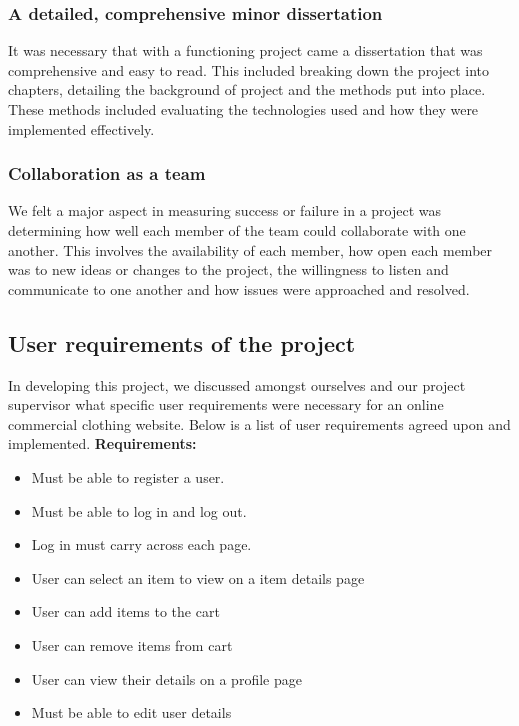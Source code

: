 \subsubsection{A detailed, comprehensive minor dissertation} It was necessary that with a functioning project came a dissertation that was comprehensive and easy to read. This included breaking down the project into chapters, detailing the background of project and the methods put into place. These methods included evaluating the technologies used and how they were implemented effectively.

\subsubsection{Collaboration as a team}
We felt a major aspect in measuring success or failure in a project was determining how well each member of the team could collaborate with one another. This involves the availability of each member, how open each member was to new ideas or changes to the project, the willingness to listen and communicate to one another and how issues were approached and resolved.

\subsection{User requirements of the project}
In developing this project, we discussed amongst ourselves and our project supervisor what specific user requirements were necessary for an online commercial clothing website. Below is a list of user requirements agreed upon and implemented.
\newline
\newline
\textbf{Requirements:}
\begin{itemize}
  \item Must be able to register a user.
  \item Must be able to log in and log out.
  \item Log in must carry across each page.
  \item User can select an item to view on a item details page
  \item User can add items to the cart
  \item User can remove items from cart
  \item User can view their details on a profile page
  \item Must be able to edit user details
\end{itemize}

